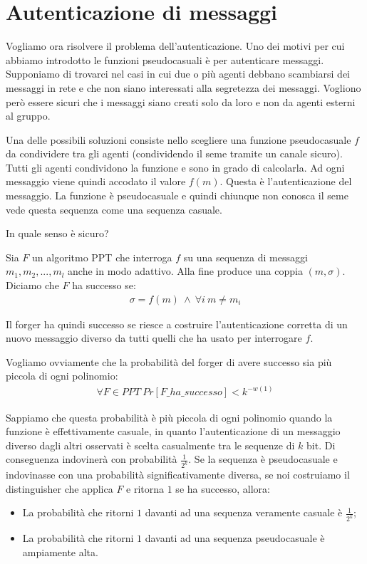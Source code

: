 \setchapterpreamble[u]{\margintoc}
\chapter{Autenticazione di messaggi}

Vogliamo ora risolvere il problema dell'autenticazione. Uno dei motivi per cui abbiamo introdotto le funzioni pseudocasuali è per autenticare messaggi. Supponiamo di trovarci nel casi in cui due o più agenti debbano scambiarsi dei messaggi in rete e che non siano interessati alla segretezza dei messaggi. Vogliono però essere sicuri che i messaggi siano creati solo da loro e non da agenti esterni al gruppo. 

Una delle possibili soluzioni consiste nello scegliere una funzione pseudocasuale $f$ da condividere tra gli agenti (condividendo il seme tramite un canale sicuro). Tutti gli agenti condividono la funzione e sono in grado di calcolarla. Ad ogni messaggio viene quindi accodato il valore $f(m)$. Questa è l'autenticazione del messaggio. La funzione è pseudocasuale e quindi chiunque non conosca il seme vede questa sequenza come una sequenza casuale. 

In quale senso è sicuro?

\begin{definition}
    Sia $F$ un algoritmo PPT che interroga $f$ su una sequenza di messaggi $m_1, m_2, ..., m_l$ anche in modo adattivo. Alla fine produce una coppia $(m, \sigma)$. Diciamo che $F$ ha successo se:
    \begin{align}
        \sigma = f(m) \ \land \ \forall i \ m \ne m_i
    \end{align}
\end{definition}

\noindent Il forger ha quindi successo se riesce a costruire l'autenticazione corretta di un nuovo messaggio diverso da tutti quelli che ha usato per interrogare $f$. 

Vogliamo ovviamente che la probabilità del forger di avere successo sia più piccola di ogni polinomio:
\begin{align*}
    \forall F \in PPT \ Pr[F\_ha\_successo] < k^{-w(1)}
\end{align*}

\noindent Sappiamo che questa probabilità è più piccola di ogni polinomio quando la funzione è effettivamente casuale, in quanto l'autenticazione di un messaggio diverso dagli altri osservati è scelta casualmente tra le sequenze di $k$ bit. Di conseguenza indovinerà con probabilità $\frac{1}{2^k}$. Se la sequenza è pseudocasuale e indovinasse con una probabilità significativamente diversa, se noi costruiamo il distinguisher che applica $F$ e ritorna $1$ se ha successo, allora:
\begin{itemize}
    \item La probabilità che ritorni $1$ davanti ad una sequenza veramente casuale è $\frac{1}{2^k}$;
    \item La probabilità  che ritorni $1$ davanti ad una sequenza pseudocasuale è ampiamente alta.
\end{itemize}

